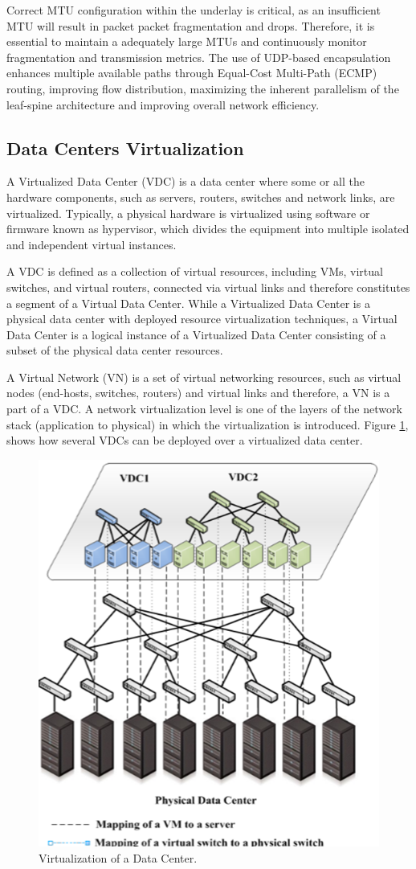 Correct MTU configuration within the underlay is critical, as an insufficient MTU will result in packet packet fragmentation and drops. Therefore, it is essential to maintain a adequately large MTUs and continuously monitor fragmentation and transmission metrics. The use of UDP-based encapsulation enhances multiple available paths through Equal-Cost Multi-Path (ECMP) routing, improving flow distribution, maximizing the inherent parallelism of the leaf-spine architecture and improving overall network efficiency. \par

\subsection{Data Centers Virtualization}

A Virtualized Data Center (VDC) is a data center where some or all the hardware components, such as servers, routers, switches and network links, are virtualized. Typically, a physical hardware is virtualized using software or firmware known as hypervisor, which divides the equipment into multiple isolated and independent virtual instances. 

A VDC is defined as a collection of virtual resources, including VMs, virtual switches, and virtual routers, connected via virtual links and therefore constitutes a segment of a Virtual Data Center. While a Virtualized Data Center is a physical data center with deployed resource virtualization techniques, a Virtual Data Center is a logical instance of a Virtualized Data Center consisting of a subset of the physical data center resources. 


A Virtual Network (VN) is a set of virtual networking resources, such as virtual nodes (end-hosts, switches, routers) and virtual links and therefore, a VN is a part of a VDC. A network virtualization level is one of the layers of the network stack (application to physical) in which the virtualization is introduced. Figure \ref{virtualization}, shows how several VDCs can be deployed over a virtualized data center. 

\begin{figure}[H]
    \centering
    \includegraphics[width=0.4\linewidth]{Figures/virtualization.png}
    \caption{Virtualization of a Data Center. \cite{bari2013datacenter}}
    \label{virtualization}
\end{figure}

